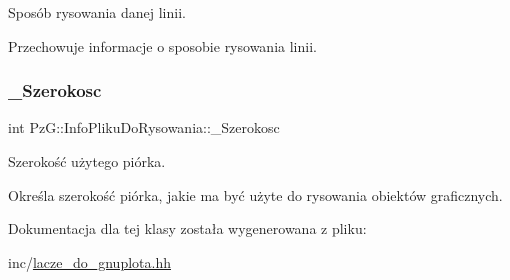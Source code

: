 Sposób rysowania danej linii. 

Przechowuje informacje o sposobie rysowania linii. \mbox{\label{classPzG_1_1InfoPlikuDoRysowania_a56a03dde7a7a414dbf3c230812a8d741}} 
\subsubsection{\texorpdfstring{\+\_\+\+Szerokosc}{\_Szerokosc}}
{\footnotesize\ttfamily int Pz\+G\+::\+Info\+Pliku\+Do\+Rysowania\+::\+\_\+\+Szerokosc\hspace{0.3cm}{\ttfamily [private]}}



Szerokość użytego piórka. 

Określa szerokość piórka, jakie ma być użyte do rysowania obiektów graficznych. 

Dokumentacja dla tej klasy została wygenerowana z pliku\+:\begin{DoxyCompactItemize}
\item 
inc/\hyperlink{lacze__do__gnuplota_8hh}{lacze\+\_\+do\+\_\+gnuplota.\+hh}\end{DoxyCompactItemize}
